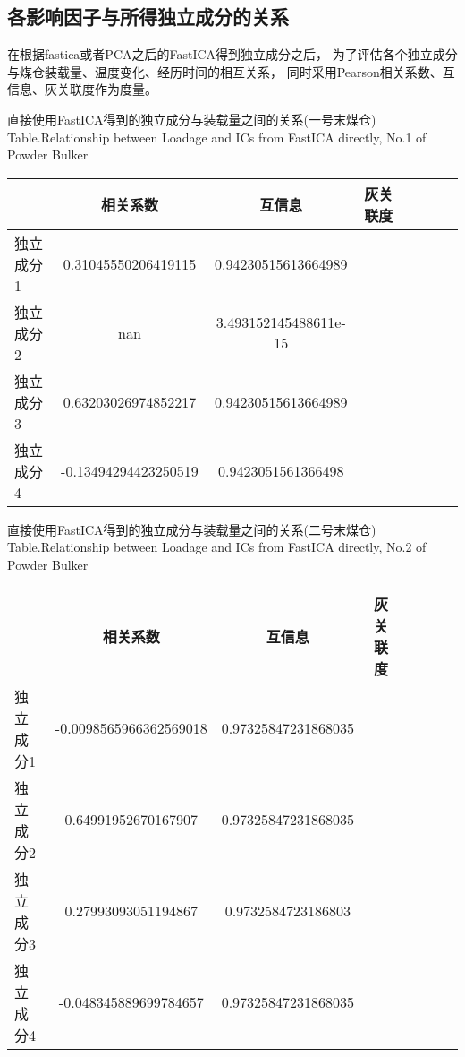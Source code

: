 \subsection{各影响因子与所得独立成分的关系}
在根据fastica或者PCA之后的FastICA得到独立成分之后，
为了评估各个独立成分与煤仓装载量、温度变化、经历时间的相互关系，
同时采用Pearson相关系数、互信息、灰关联度作为度量。

\begin{table}[!htb]
\begin{center}
			{直接使用FastICA得到的独立成分与装载量之间的关系(一号末煤仓)}
			{Table.}{Relationship between Loadage and ICs from FastICA directly, No.1 of Powder Bulker}
\begin{tabular}{lccclccc}
\toprule
                		& 相关系数     				& 互信息      					&灰关联度 \\
\midrule
  独立成分1     	&  0.31045550206419115       	& 0.94230515613664989   	&    \\
  独立成分2     	&  nan          					& 3.493152145488611e-15   	&    \\
  独立成分3     	&  0.63203026974852217      	& 0.94230515613664989		&    \\
  独立成分4     	&  -0.13494294423250519    	& 0.9423051561366498		&    \\
 \bottomrule
\end{tabular}
\end{center}
\end{table}

\begin{table}[!htb]
\begin{center}
			{直接使用FastICA得到的独立成分与装载量之间的关系(二号末煤仓)}
			{Table.}{Relationship between Loadage and ICs from FastICA directly, No.2 of Powder Bulker}
\begin{tabular}{lccclccc}
\toprule
                		& 相关系数     				& 互信息      					&灰关联度 \\
\midrule
  独立成分1     	&  -0.0098565966362569018  	& 0.97325847231868035   	&    \\
  独立成分2     	&  0.64991952670167907		& 0.97325847231868035   	&    \\
  独立成分3     	&  0.27993093051194867      	& 0.9732584723186803		&    \\
  独立成分4     	&  -0.048345889699784657    	& 0.97325847231868035		&    \\
 \bottomrule
\end{tabular}
\end{center}
\end{table}

